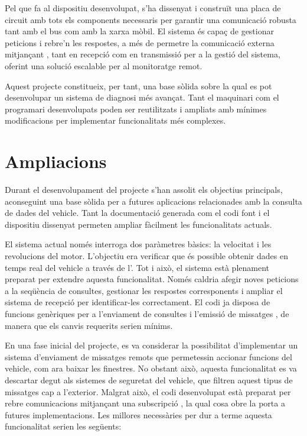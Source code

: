 \documentclass{tfgitic}[2024/07/01]
\begin{document}
Pel que fa al dispositiu desenvolupat, s'ha dissenyat i construït una placa de circuit amb tots els components necessaris per garantir una comunicació robusta tant amb el bus  com amb 
la xarxa mòbil. El sistema és capaç de gestionar peticions  i rebre'n les respostes, a més de permetre la comunicació externa mitjançant , tant en recepció com en transmissió per 
a la gestió del sistema, oferint una solució escalable per al monitoratge remot.

Aquest projecte constitueix, per tant, una base sòlida sobre la qual es pot desenvolupar un sistema de diagnosi més avançat. Tant el maquinari com el programari desenvolupats poden ser reutilitzats 
i ampliats amb mínimes modificacions per implementar funcionalitats més complexes.


\chapter{Ampliacions}

Durant el desenvolupament del projecte s'han assolit els objectius principals, aconseguint una base sòlida per a futures aplicacions relacionades amb la consulta de dades del vehicle. 
Tant la documentació generada com el codi font i el dispositiu dissenyat permeten ampliar fàcilment les funcionalitats actuals.

El sistema actual només interroga dos paràmetres bàsics: la velocitat i les revolucions del motor. L'objectiu era verificar que és possible obtenir dades en temps real del vehicle a 
través de l'. Tot i això, el sistema està plenament preparat per extendre aquesta funcionalitat. Només caldria afegir noves peticions  a la seqüència de consultes, gestionar 
les respostes corresponents i ampliar el sistema de recepció per identificar-les correctament. El codi ja disposa de funcions genèriques per a l'enviament de consultes  i l'emissió de
missatges , de manera que els canvis requerits serien mínims.

En una fase inicial del projecte, es va considerar la possibilitat d'implementar un sistema d'enviament de missatges remots que permetessin accionar funcions del vehicle, com ara baixar 
les finestres. No obstant això, aquesta funcionalitat es va descartar degut als sistemes de seguretat del vehicle, que filtren aquest tipus de missatges cap a l'exterior. Malgrat això, 
el codi desenvolupat està preparat per rebre comunicacions mitjançant una subscripció , la qual cosa obre la porta a futures implementacions. Les millores necessàries per dur a terme 
aquesta funcionalitat serien les següents:
\end{document}
